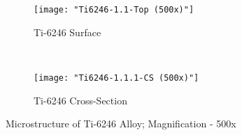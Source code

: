 \begin{figure}[H]
    \centering
    \begin{subfigure}{0.49\textwidth}
        \texttt{[image: "Ti6246-1.1-Top (500x)"]}
        \caption{Ti-6246 Surface}
        \label{fig:2a}
    \end{subfigure}
    ~
    \begin{subfigure}{0.49\textwidth}
        \texttt{[image: "Ti6246-1.1.1-CS (500x)"]}
        \caption{Ti-6246 Cross-Section}
        \label{fig:2b}
    \end{subfigure}
    \caption{Microstructure of Ti-6246 Alloy; Magnification - 500x}
    \label{fig:As-Received}
\end{figure}